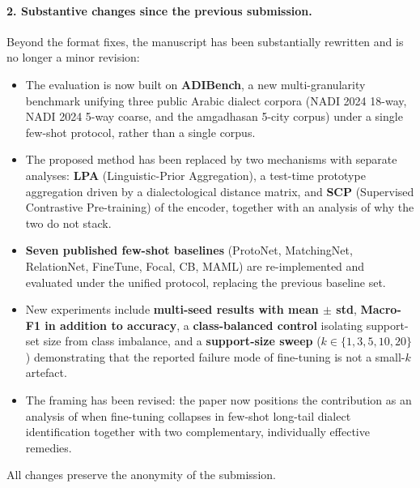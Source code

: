 \documentclass[11pt]{article}
\begin{document}
\paragraph{2. Substantive changes since the previous submission.}
Beyond the format fixes, the manuscript has been substantially rewritten and is no longer a minor revision:
\begin{itemize}
\item The evaluation is now built on \textbf{ADIBench}, a new multi-granularity benchmark unifying three public Arabic dialect corpora (NADI 2024 18-way, NADI 2024 5-way coarse, and the amgadhasan 5-city corpus) under a single few-shot protocol, rather than a single corpus.
\item The proposed method has been replaced by two mechanisms with separate analyses: \textbf{LPA} (Linguistic-Prior Aggregation), a test-time prototype aggregation driven by a dialectological distance matrix, and \textbf{SCP} (Supervised Contrastive Pre-training) of the encoder, together with an analysis of why the two do not stack.
\item \textbf{Seven published few-shot baselines} (ProtoNet, MatchingNet, RelationNet, FineTune, Focal, CB, MAML) are re-implemented and evaluated under the unified protocol, replacing the previous baseline set.
\item New experiments include \textbf{multi-seed results with mean $\pm$ std}, \textbf{Macro-F1 in addition to accuracy}, a \textbf{class-balanced control} isolating support-set size from class imbalance, and a \textbf{support-size sweep} ($k \in \{1,3,5,10,20\}$) demonstrating that the reported failure mode of fine-tuning is not a small-$k$ artefact.
\item The framing has been revised: the paper now positions the contribution as an analysis of when fine-tuning collapses in few-shot long-tail dialect identification together with two complementary, individually effective remedies.
\end{itemize}

All changes preserve the anonymity of the submission.
\end{document}
